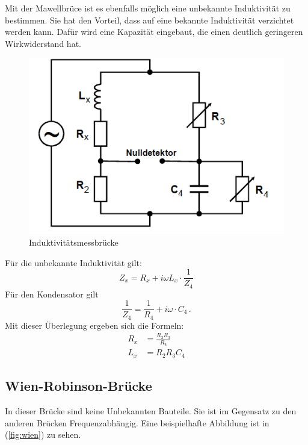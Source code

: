 Mit der Mawellbrüce ist es ebenfalls möglich eine unbekannte Induktivität zu bestimmen.
Sie hat den Vorteil, dass auf eine bekannte Induktivität verzichtet werden kann.
Dafür wird eine Kapazität eingebaut, die einen deutlich geringeren Wirkwiderstand hat.
\begin{figure}
  \centering
  \includegraphics[scale = 0.7]{Max.PNG}
  \caption{Induktivitätsmessbrücke\protect\cite{on3}}
  \label{fig:max}
\end{figure}
Für die unbekannte Induktivität gilt:
\begin{equation*}
  Z_x = R_x +i\omega L_x\cdot \frac{1}{Z_4}
\end{equation*}
Für den Kondensator gilt
\begin{equation*}
  \frac{1}{Z_4} = \frac{1}{R_4} + i\omega \cdot C_4 \, .
\end{equation*}
Mit dieser Überlegung ergeben sich die Formeln:
\begin{align}
  R_x &= \frac{R_2R_3}{R_4} \\
  L_x &= R_2R_3C_4
\end{align}

\subsection{Wien-Robinson-Brücke}
In dieser Brücke sind keine Unbekannten Bauteile.
Sie ist im Gegensatz zu den anderen Brücken Frequenzabhängig.
Eine beispielhafte Abbildung ist in (\ref{fig:wien}) zu sehen.

